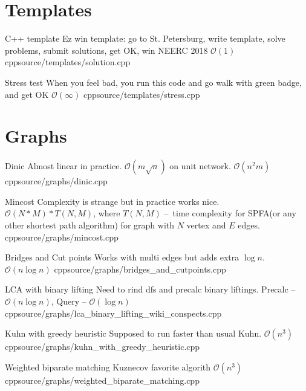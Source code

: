 \documentclass[landscape, 10pt, a4paper, oneside, twocolumn]{extarticle}
\begin{document}
\maketitlepage






\section{Templates}

\Algorithm
{C++ template}
{Ez win template: go to St. Petersburg, write template, solve problems, submit solutions, get OK, win NEERC 2018}
{$\mathcal{O}(1)$}
{cpp}{source/templates/solution.cpp}

\Algorithm
{Stress test}
{When you feel bad, you run this code and go walk with green badge, and get OK}
{$\mathcal{O}(\infty)$}
{cpp}{source/templates/stress.cpp}

\section{Graphs}

\Algorithm
{Dinic}
{Almost linear in practice. $\mathcal{O}(m \sqrt n)$ on unit network.}
{$\mathcal{O}(n^{2}m)$}
{cpp}{source/graphs/dinic.cpp}

\Algorithm
{Mincost}
{Complexity is strange but in practice works nice.}
{$\mathcal{O}(N * M) * T(N, M)$, where $T(N, M)$ – time complexity for SPFA(or any other shortest path algorithm) for graph with $N$ vertex and $E$ edges.}
{cpp}{source/graphs/mincost.cpp}

\Algorithm
{Bridges and Cut points}
{Works with multi edges but adds extra $ \log n$.}
{$\mathcal{O}(n \log n)$}
{cpp}{source/graphs/bridges_and_cutpoints.cpp}

\Algorithm
{LCA with binary lifting}
{Need to rind dfs and precalc binary liftings.}
{Precalc – $\mathcal{O}(n \log n)$, Query – $\mathcal{O}(\log n)$}
{cpp}{source/graphs/lca_binary_lifting_wiki_conspects.cpp}

\Algorithm
{Kuhn with greedy heuristic}
{Supposed to run faster than usual Kuhn.}
{$\mathcal{O}(n^{3})$}
{cpp}{source/graphs/kuhn_with_greedy_heuristic.cpp}

\Algorithm
{Weighted biparate matching}
{Kuznecov favorite algorith}
{$\mathcal{O}(n^{3})$}
{cpp}{source/graphs/weighted_biparate_matching.cpp}


\end{document}
